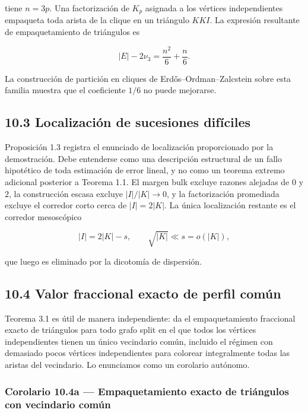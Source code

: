 \documentclass[
  11pt,
]{article}
\begin{document}
tiene \(n=3p\). Una factorización de \(K_p\) asignada a los vértices independientes empaqueta toda arista de la clique en un triángulo \(KKI\). La expresión resultante de empaquetamiento de triángulos es

\[
|E|-2\nu_3
=
\frac{n^2}{6}+\frac n6.
\tag{10.1}
\]

La construcción de partición en cliques de Erdős--Ordman--Zalcstein sobre esta familia muestra que el coeficiente \(1/6\) no puede mejorarse.

\subsection{10.3 Localización de sucesiones difíciles}\label{localizaciuxf3n-de-sucesiones-difuxedciles}

Proposición 1.3 registra el enunciado de localización proporcionado por la demostración. Debe entenderse como una descripción estructural de un fallo hipotético de toda estimación de error lineal, y no como un teorema extremo adicional posterior a Teorema 1.1. El margen bulk excluye razones alejadas de \(0\) y \(2\), la construcción escasa excluye \(|I|/|K|\to0\), y la factorización promediada excluye el corredor corto cerca de \(|I|=2|K|\). La única localización restante es el corredor mesoscópico

\[
|I|=2|K|-s,
\qquad
\sqrt{|K|}\ll s=o(|K|),
\]

que luego es eliminado por la dicotomía de dispersión.

\subsection{10.4 Valor fraccional exacto de perfil común}\label{valor-fraccional-exacto-de-perfil-comuxfan}

Teorema 3.1 es útil de manera independiente: da el empaquetamiento fraccional exacto de triángulos para todo grafo split en el que todos los vértices independientes tienen un único vecindario común, incluido el régimen con demasiado pocos vértices independientes para colorear integralmente todas las aristas del vecindario. Lo enunciamos como un corolario autónomo.

\subsubsection{Corolario 10.4a --- Empaquetamiento exacto de triángulos con vecindario común}\label{corolario-10.4a-empaquetamiento-exacto-de-triuxe1ngulos-con-vecindario-comuxfan}
\end{document}

